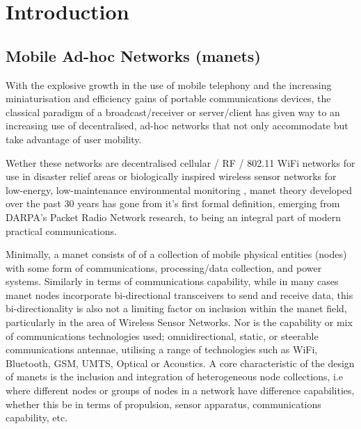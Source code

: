 \def\ChapterTitle{Introduction} %

\ifx\ifthesis\undefined

\else
\chapter{\ChapterTitle}
\label{Chapter\thechapter}
\fi

\section{Mobile Ad-hoc Networks (\acrshort{manet}s)}

With the explosive growth in the use of mobile telephony and the increasing miniaturisation and efficiency gains of portable communications devices, the classical paradigm of a broadcast/receiver or server/client has given way to an increasing use of decentralised, ad-hoc networks that not only accommodate but take advantage of user mobility.

Wether these networks are decentralised cellular / RF / 802.11 WiFi networks for use in disaster relief areas \cite{Milliken2015} or biologically inspired wireless sensor networks for low-energy, low-maintenance environmental monitoring \cite{Bhargavi2015}, \gls{manet} theory developed over the past 30 years has gone from it's first formal definition, emerging from DARPA's Packet Radio Network research\cite{Jubin1987}, to being an integral part of modern practical communications.

Minimally, a \gls{manet} consists of of a collection of mobile physical entities (nodes) with some form of communications, processing/data collection, and power systems.
Similarly in terms of communications capability, while in many cases \gls{manet} nodes incorporate bi-directional transceivers to send and receive data, this bi-directionality is also not a limiting factor on inclusion within the \gls{manet} field, particularly in the area of Wireless Sensor Networks\cite{Akyildiz2002}.
Nor is the capability or mix of communications technologies used; omnidirectional, static, or steerable communications antennae, utilising a range of technologies such as WiFi, Bluetooth, GSM, UMTS, Optical or Acoustics.
A core characteristic of the design of \gls{manet}s is the inclusion and integration of heterogeneous node collections, i.e where different nodes or groups of nodes in a network have difference capabilities, whether this be in terms of propulsion, sensor apparatus, communications capability, etc.

